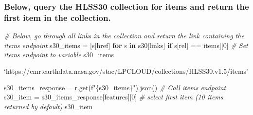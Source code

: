 \documentclass[
  letterpaper,
]{scrartcl}
\newenvironment{Shaded}{}{}
\newcommand{\CommentTok}[1]{\textcolor[rgb]{0.38,0.63,0.69}{\textit{#1}}}
\newcommand{\ControlFlowTok}[1]{\textcolor[rgb]{0.00,0.44,0.13}{\textbf{#1}}}
\newcommand{\DecValTok}[1]{\textcolor[rgb]{0.25,0.63,0.44}{#1}}
\newcommand{\KeywordTok}[1]{\textcolor[rgb]{0.00,0.44,0.13}{\textbf{#1}}}
\newcommand{\NormalTok}[1]{#1}
\newcommand{\OperatorTok}[1]{\textcolor[rgb]{0.40,0.40,0.40}{#1}}
\newcommand{\SpecialCharTok}[1]{\textcolor[rgb]{0.25,0.44,0.63}{#1}}
\newcommand{\SpecialStringTok}[1]{\textcolor[rgb]{0.73,0.40,0.53}{#1}}
\newcommand{\StringTok}[1]{\textcolor[rgb]{0.25,0.44,0.63}{#1}}
\begin{document}
\hypertarget{below-query-the-hlss30-collection-for-items-and-return-the-first-item-in-the-collection.}{%
\subsubsection{Below, query the HLSS30 collection for items and return
the first item in the
collection.}\label{below-query-the-hlss30-collection-for-items-and-return-the-first-item-in-the-collection.}}

\begin{Shaded}
\begin{Highlighting}[]
\CommentTok{\# Below, go through all links in the collection and return the link containing the items endpoint}
\NormalTok{s30\_items }\OperatorTok{=}\NormalTok{ [s[}\StringTok{\textquotesingle{}href\textquotesingle{}}\NormalTok{] }\ControlFlowTok{for}\NormalTok{ s }\KeywordTok{in}\NormalTok{ s30[}\StringTok{\textquotesingle{}links\textquotesingle{}}\NormalTok{] }\ControlFlowTok{if}\NormalTok{ s[}\StringTok{\textquotesingle{}rel\textquotesingle{}}\NormalTok{] }\OperatorTok{==} \StringTok{\textquotesingle{}items\textquotesingle{}}\NormalTok{][}\DecValTok{0}\NormalTok{]  }\CommentTok{\# Set items endpoint to variable}
\NormalTok{s30\_items}
\end{Highlighting}
\end{Shaded}

`https://cmr.earthdata.nasa.gov/stac/LPCLOUD/collections/HLSS30.v1.5/items'

\begin{Shaded}
\begin{Highlighting}[]
\NormalTok{s30\_items\_response }\OperatorTok{=}\NormalTok{ r.get(}\SpecialStringTok{f"}\SpecialCharTok{\{}\NormalTok{s30\_items}\SpecialCharTok{\}}\SpecialStringTok{"}\NormalTok{).json()                        }\CommentTok{\# Call items endpoint}
\NormalTok{s30\_item }\OperatorTok{=}\NormalTok{ s30\_items\_response[}\StringTok{\textquotesingle{}features\textquotesingle{}}\NormalTok{][}\DecValTok{0}\NormalTok{]                             }\CommentTok{\# select first item (10 items returned by default)}
\NormalTok{s30\_item}
\end{Highlighting}
\end{Shaded}
\end{document}
